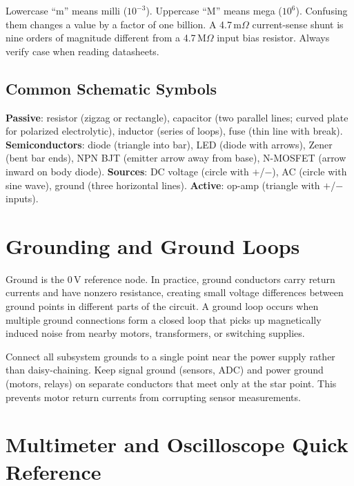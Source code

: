\begin{warningbox}
Lowercase ``m'' means milli ($10^{-3}$). Uppercase ``M'' means mega ($10^{6}$). Confusing them changes a value by a factor of one billion. A 4.7\,m$\Omega$ current-sense shunt is nine orders of magnitude different from a 4.7\,M$\Omega$ input bias resistor. Always verify case when reading datasheets.
\end{warningbox}

\subsection{Common Schematic Symbols}
\textbf{Passive}: resistor (zigzag or rectangle), capacitor (two parallel lines; curved plate for polarized electrolytic), inductor (series of loops), fuse (thin line with break). \textbf{Semiconductors}: diode (triangle into bar), LED (diode with arrows), Zener (bent bar ends), NPN BJT (emitter arrow away from base), N-MOSFET (arrow inward on body diode). \textbf{Sources}: DC voltage (circle with $+$/$-$), AC (circle with sine wave), ground (three horizontal lines). \textbf{Active}: op-amp (triangle with $+$/$-$ inputs).


\section{Grounding and Ground Loops}

Ground is the 0\,V reference node. In practice, ground conductors carry return currents and have nonzero resistance, creating small voltage differences between ground points in different parts of the circuit. A ground loop occurs when multiple ground connections form a closed loop that picks up magnetically induced noise from nearby motors, transformers, or switching supplies.

\begin{tipbox}
Connect all subsystem grounds to a single point near the power supply rather than daisy-chaining. Keep signal ground (sensors, ADC) and power ground (motors, relays) on separate conductors that meet only at the star point. This prevents motor return currents from corrupting sensor measurements.
\end{tipbox}


\section{Multimeter and Oscilloscope Quick Reference}

